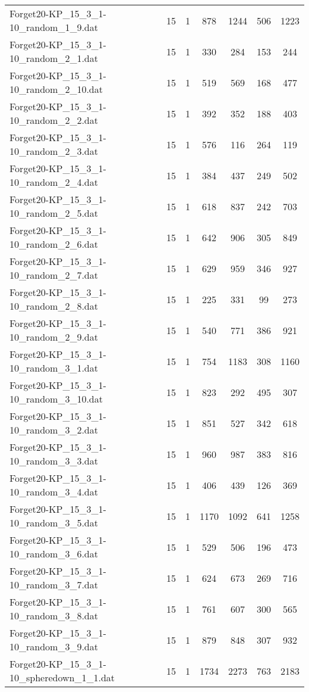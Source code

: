 \begin{table}[!ht]
\begin{tabular}{lcccccc}
Forget20-KP\_15\_3\_1-10\_random\_1\_9.dat & 15 & 1 & 878 & 1244 & 506 & 1223 \\
Forget20-KP\_15\_3\_1-10\_random\_2\_1.dat & 15 & 1 & 330 & 284 & 153 & 244 \\
Forget20-KP\_15\_3\_1-10\_random\_2\_10.dat & 15 & 1 & 519 & 569 & 168 & 477 \\
Forget20-KP\_15\_3\_1-10\_random\_2\_2.dat & 15 & 1 & 392 & 352 & 188 & 403 \\
Forget20-KP\_15\_3\_1-10\_random\_2\_3.dat & 15 & 1 & 576 & 116 & 264 & 119 \\
Forget20-KP\_15\_3\_1-10\_random\_2\_4.dat & 15 & 1 & 384 & 437 & 249 & 502 \\
Forget20-KP\_15\_3\_1-10\_random\_2\_5.dat & 15 & 1 & 618 & 837 & 242 & 703 \\
Forget20-KP\_15\_3\_1-10\_random\_2\_6.dat & 15 & 1 & 642 & 906 & 305 & 849 \\
Forget20-KP\_15\_3\_1-10\_random\_2\_7.dat & 15 & 1 & 629 & 959 & 346 & 927 \\
Forget20-KP\_15\_3\_1-10\_random\_2\_8.dat & 15 & 1 & 225 & 331 & 99 & 273 \\
Forget20-KP\_15\_3\_1-10\_random\_2\_9.dat & 15 & 1 & 540 & 771 & 386 & 921 \\
Forget20-KP\_15\_3\_1-10\_random\_3\_1.dat & 15 & 1 & 754 & 1183 & 308 & 1160 \\
Forget20-KP\_15\_3\_1-10\_random\_3\_10.dat & 15 & 1 & 823 & 292 & 495 & 307 \\
Forget20-KP\_15\_3\_1-10\_random\_3\_2.dat & 15 & 1 & 851 & 527 & 342 & 618 \\
Forget20-KP\_15\_3\_1-10\_random\_3\_3.dat & 15 & 1 & 960 & 987 & 383 & 816 \\
Forget20-KP\_15\_3\_1-10\_random\_3\_4.dat & 15 & 1 & 406 & 439 & 126 & 369 \\
Forget20-KP\_15\_3\_1-10\_random\_3\_5.dat & 15 & 1 & 1170 & 1092 & 641 & 1258 \\
Forget20-KP\_15\_3\_1-10\_random\_3\_6.dat & 15 & 1 & 529 & 506 & 196 & 473 \\
Forget20-KP\_15\_3\_1-10\_random\_3\_7.dat & 15 & 1 & 624 & 673 & 269 & 716 \\
Forget20-KP\_15\_3\_1-10\_random\_3\_8.dat & 15 & 1 & 761 & 607 & 300 & 565 \\
Forget20-KP\_15\_3\_1-10\_random\_3\_9.dat & 15 & 1 & 879 & 848 & 307 & 932 \\
Forget20-KP\_15\_3\_1-10\_spheredown\_1\_1.dat & 15 & 1 & 1734 & 2273 & 763 & 2183 \\

\end{tabular}
\end{table}
